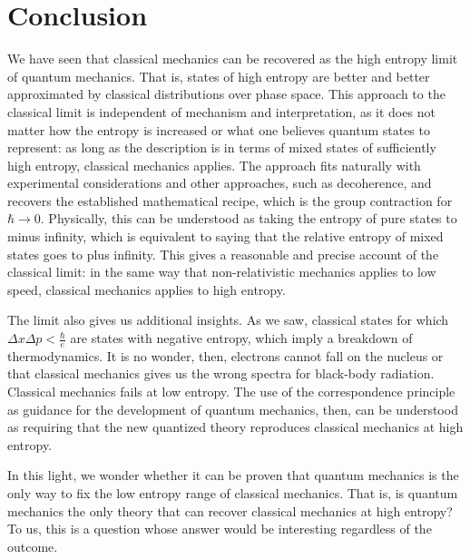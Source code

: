 \documentclass{article}
\begin{document}
\section{Conclusion}

We have seen that classical mechanics can be recovered as the high entropy limit of quantum mechanics. That is, states of high entropy are better and better approximated by classical distributions over phase space. This approach to the classical limit is independent of mechanism and interpretation, as it does not matter how the entropy is increased or what one believes quantum states to represent: as long as the description is in terms of mixed states of sufficiently high entropy, classical mechanics applies. The approach fits naturally with experimental considerations and other approaches, such as decoherence, and recovers the established mathematical recipe, which is the group contraction for $\hbar \to 0$. Physically, this can be understood as taking the entropy of pure states to minus infinity, which is equivalent to saying that the relative entropy of mixed states goes to plus infinity. This gives a reasonable and precise account of the classical limit: in the same way that non-relativistic mechanics applies to low speed, classical mechanics applies to high entropy.

The limit also gives us additional insights. As we saw, classical states for which $\Delta x \Delta p < \frac{\hbar}{e}$ are states with negative entropy, which imply a breakdown of thermodynamics. It is no wonder, then, electrons cannot fall on the nucleus or that classical mechanics gives us the wrong spectra for black-body radiation. Classical mechanics fails at low entropy. The use of the correspondence principle as guidance for the development of quantum mechanics, then, can be understood as requiring that the new quantized theory reproduces classical mechanics at high entropy. 

In this light, we wonder whether it can be proven that quantum mechanics is the only way to fix the low entropy range of classical mechanics. That is, is quantum mechanics the only theory that can recover classical mechanics at high entropy? To us, this is a question whose answer would be interesting regardless of the outcome.



\end{document}
